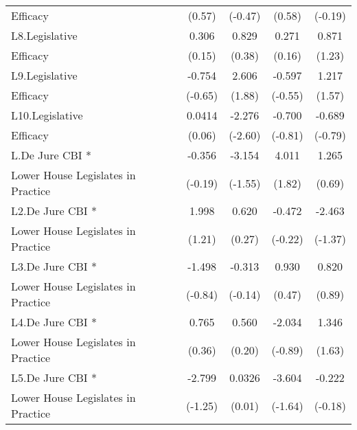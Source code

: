 {\begin{tabular}{l*{4}{c}}
Efficacy            &      (0.57)         &     (-0.47)         &      (0.58)         &     (-0.19)         \\
[1em]
L8.Legislative      &       0.306         &       0.829         &       0.271         &       0.871         \\
Efficacy            &      (0.15)         &      (0.38)         &      (0.16)         &      (1.23)         \\
[1em]
L9.Legislative      &      -0.754         &       2.606         &      -0.597         &       1.217         \\
Efficacy            &     (-0.65)         &      (1.88)         &     (-0.55)         &      (1.57)         \\
[1em]
L10.Legislative     &      0.0414         &      -2.276\sym{**} &      -0.700         &      -0.689         \\
Efficacy            &      (0.06)         &     (-2.60)         &     (-0.81)         &     (-0.79)         \\
[1em]
L.De Jure CBI *     &      -0.356         &      -3.154         &       4.011         &       1.265         \\
Lower House Legislates in Practice&     (-0.19)         &     (-1.55)         &      (1.82)         &      (0.69)         \\
[1em]
L2.De Jure CBI *    &       1.998         &       0.620         &      -0.472         &      -2.463         \\
Lower House Legislates in Practice&      (1.21)         &      (0.27)         &     (-0.22)         &     (-1.37)         \\
[1em]
L3.De Jure CBI *    &      -1.498         &      -0.313         &       0.930         &       0.820         \\
Lower House Legislates in Practice&     (-0.84)         &     (-0.14)         &      (0.47)         &      (0.89)         \\
[1em]
L4.De Jure CBI *    &       0.765         &       0.560         &      -2.034         &       1.346         \\
Lower House Legislates in Practice&      (0.36)         &      (0.20)         &     (-0.89)         &      (1.63)         \\
[1em]
L5.De Jure CBI *    &      -2.799         &      0.0326         &      -3.604         &      -0.222         \\
Lower House Legislates in Practice&     (-1.25)         &      (0.01)         &     (-1.64)         &     (-0.18)         \\

\end{tabular}}
